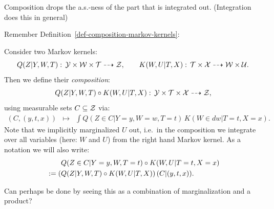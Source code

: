 \begin{Con}[Composition]\label{con:nullsets_composition-markov-kernels}
  Composition drops the a.s.-ness of the part that is integrated out.
  (Integration does this in general)

  Remember Definition~\ref{def-composition-markov-kernels}:
\begin{Def}
    Consider two Markov kernels:
    \[ Q(Z|Y,W,T):\, \mathcal{Y} \times \mathcal{W}\times \mathcal{T} \dashrightarrow \mathcal{Z},\qquad  K(W,U|T,X):\, 
    \mathcal{T} \times \mathcal{X} \dashrightarrow \mathcal{W}\times\mathcal{U}. \]
    Then we define their \emph{composition}:
    \[ Q(Z|Y,W,T) \circ K(W,U|T,X) :\, \mathcal{Y} \times  \mathcal{T} \times \mathcal{X} \dashrightarrow \mathcal{Z}, \]
    using  measurable sets $C \subseteq \mathcal{Z}$ via:
    \[\begin{array}{ccl}
    (C,(y,t,x))    &\mapsto & \displaystyle \int Q(Z \in C|Y=y,W=w,T=t) \, K(W \in dw|T=t,X=x).
    \end{array}\]
    Note that we implicitly marginalized $U$ out, i.e.\ in the composition we integrate over all variables (here: $W$ and $U$) 
    from the right hand Markov kernel.
    As a notation we will also write:
    \begin{align*} & \qquad Q(Z \in C|Y=y,W,T=t) \circ K(W,U|T=t,X=x) \\
    &:= \left ( Q(Z|Y,W,T) \circ K(W,U|T,X)\right ) (C|(y,t,x)).  \end{align*}
\end{Def}
  Can perhaps be done by seeing this as a combination of marginalization and a product?
\end{Con}
